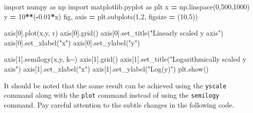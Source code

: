 \documentclass[
]{book}
\newenvironment{Shaded}{\begin{snugshade}}{\end{snugshade}}
\newcommand{\DecValTok}[1]{\textcolor[rgb]{0.00,0.00,0.81}{#1}}
\newcommand{\FloatTok}[1]{\textcolor[rgb]{0.00,0.00,0.81}{#1}}
\newcommand{\ImportTok}[1]{#1}
\newcommand{\NormalTok}[1]{#1}
\newcommand{\OperatorTok}[1]{\textcolor[rgb]{0.81,0.36,0.00}{\textbf{#1}}}
\newcommand{\StringTok}[1]{\textcolor[rgb]{0.31,0.60,0.02}{#1}}
\theoremstyle{definition}
\theoremstyle{definition}
\theoremstyle{definition}
\theoremstyle{remark}
\begin{document}
\begin{Shaded}
\begin{Highlighting}[]
\ImportTok{import}\NormalTok{ numpy }\ImportTok{as}\NormalTok{ np}
\ImportTok{import}\NormalTok{ matplotlib.pyplot }\ImportTok{as}\NormalTok{ plt}
\NormalTok{x }\OperatorTok{=}\NormalTok{ np.linspace(}\DecValTok{0}\NormalTok{,}\DecValTok{500}\NormalTok{,}\DecValTok{1000}\NormalTok{)}
\NormalTok{y }\OperatorTok{=} \DecValTok{10}\OperatorTok{**}\NormalTok{(}\OperatorTok{{-}}\FloatTok{0.01}\OperatorTok{*}\NormalTok{x)}
\NormalTok{fig, axis }\OperatorTok{=}\NormalTok{ plt.subplots(}\DecValTok{1}\NormalTok{,}\DecValTok{2}\NormalTok{, figsize }\OperatorTok{=}\NormalTok{ (}\DecValTok{10}\NormalTok{,}\DecValTok{5}\NormalTok{))}

\NormalTok{axis[}\DecValTok{0}\NormalTok{].plot(x,y, }\StringTok{\textquotesingle{}r\textquotesingle{}}\NormalTok{)}
\NormalTok{axis[}\DecValTok{0}\NormalTok{].grid()}
\NormalTok{axis[}\DecValTok{0}\NormalTok{].set\_title(}\StringTok{"Linearly scaled y axis"}\NormalTok{)}
\NormalTok{axis[}\DecValTok{0}\NormalTok{].set\_xlabel(}\StringTok{"x"}\NormalTok{)}
\NormalTok{axis[}\DecValTok{0}\NormalTok{].set\_ylabel(}\StringTok{"y"}\NormalTok{)}

\NormalTok{axis[}\DecValTok{1}\NormalTok{].semilogy(x,y, }\StringTok{\textquotesingle{}k{-}{-}\textquotesingle{}}\NormalTok{)}
\NormalTok{axis[}\DecValTok{1}\NormalTok{].grid()}
\NormalTok{axis[}\DecValTok{1}\NormalTok{].set\_title(}\StringTok{"Logarithmically scaled y axis"}\NormalTok{)}
\NormalTok{axis[}\DecValTok{1}\NormalTok{].set\_xlabel(}\StringTok{"x"}\NormalTok{)}
\NormalTok{axis[}\DecValTok{1}\NormalTok{].set\_ylabel(}\StringTok{"Log(y)"}\NormalTok{)}
\NormalTok{plt.show()}
\end{Highlighting}
\end{Shaded}

It should be noted that the same result can be achieved using the \texttt{yscale} command along with the \texttt{plot} command instead of using the \texttt{semilogy} command. Pay careful attention to the subtle changes in the following code.
\end{document}
